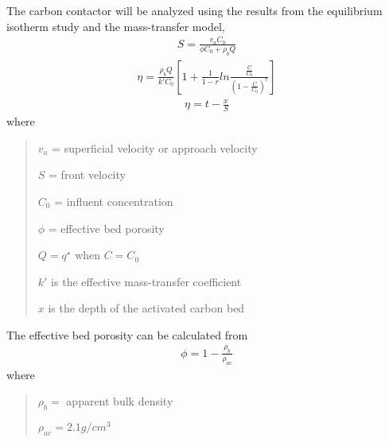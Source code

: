\documentclass[letterpaper,10pt,english]{sphinxmanual}
\begin{document}
The carbon contactor will be analyzed using the results from the equilibrium isotherm study and the mass-transfer model,
\begin{equation}\label{equation:Adsorption/Adsorption:Adsorption/Adsorption:2}
\begin{split}S=\frac{v_a C_{0} }{\phi C_{0} +\rho _{b} Q}\end{split}
\end{equation}\begin{equation}\label{equation:Adsorption/Adsorption:Adsorption/Adsorption:3}
\begin{split}\eta =\frac{\rho _b Q}{k'C_0 }\left[1+\frac{1}{1-r} ln\frac{\frac{ C }{C_0}} {\left(1-\frac{ C }{C_0} \right)^r}  \right]\end{split}
\end{equation}\begin{equation}\label{equation:Adsorption/Adsorption:Adsorption/Adsorption:4}
\begin{split}\eta =t- \frac{x}{S}\end{split}
\end{equation}
where
\begin{quote}

\begin{DUlineblock}{0em}
\item[] \(v_a\) =  superficial velocity or approach velocity
\item[] \(S\) = front velocity
\item[] \(C_0\) = influent concentration
\item[] \(\phi\) = effective bed porosity
\item[] \(Q = q^\star\) when \(C = C_0\)
\item[] \(k'\) is the effective mass-transfer coefficient
\item[] \(x\) is the depth of the activated carbon bed
\end{DUlineblock}
\end{quote}

The effective bed porosity can be calculated from
\begin{equation}\label{equation:Adsorption/Adsorption:Adsorption/Adsorption:5}
\begin{split}\phi =1-\frac{\rho _b }{\rho _{ac} }\end{split}
\end{equation}
where
\begin{quote}

\begin{DUlineblock}{0em}
\item[] \(\rho_b =\) apparent bulk density
\item[] \(\rho_{ac}  =  2.1 g/cm^3\)
\end{DUlineblock}
\end{quote}
\end{document}
